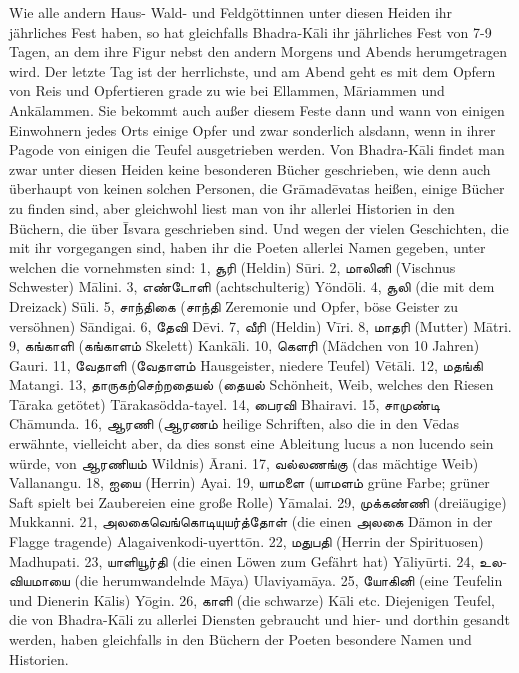 \documentclass{article}
\newcommand{\TamilText}[1]{\texttamil{#1}}
\newcommand{\tam}[1]{\TamilText{#1}}
\begin{document}
Wie alle andern Haus- Wald- und Feldgöttinnen unter diesen Heiden ihr jährliches Fest haben, so hat gleichfalls Bhadra-K\={a}li ihr jährliches Fest von 7-9 Tagen, an dem ihre Figur nebst den andern Morgens und Abends herumgetragen wird. Der letzte Tag ist der herrlichste, und am Abend geht es mit dem Opfern von Reis und Opfertieren grade zu wie bei Ellammen, M\={a}riammen und Ank\={a}lammen. Sie bekommt auch außer diesem Feste dann und wann von einigen Einwohnern jedes Orts einige Opfer und zwar sonderlich alsdann, wenn in ihrer Pagode von einigen die Teufel ausgetrieben werden. Von Bhadra-K\={a}li findet man zwar unter diesen Heiden keine besonderen Bücher geschrieben, wie denn auch überhaupt von keinen solchen Personen, die Gr\={a}mad\={e}vatas heißen, einige Bücher zu finden sind, aber gleichwohl liest man von ihr allerlei Historien in den Büchern, die über \={I}svara geschrieben sind. Und wegen der vielen Geschichten, die mit ihr vorgegangen sind, haben ihr die Poeten allerlei Namen gegeben, unter welchen die vornehmsten sind: 1, \tam{சூரி} (Heldin) S\={u}ri. 2, \tam{மாலினி} (Vischnus Schwester) M\={a}lini. 3, \tam{எண்டோளி} (achtschulterig) Yönd\={o}li. 4, \tam{சூலி} (die mit dem Dreizack) S\={u}li. 5, \tam{சாந்திகை} (\tam{சாந்தி} Zeremonie und Opfer, böse Geister zu versöhnen) S\={a}ndigai. 6, \tam{தேவி} D\={e}vi. 7, \tam{வீரி} (Heldin) V\={i}ri. 8, \tam{மாதரி} (Mutter) M\={a}tri. 9, \tam{கங்காளி} (\tam{கங்காளம்} Skelett) Kank\={a}li. 10, \tam{கெளரி} (Mädchen von 10 Jahren) Gauri. 11, \tam{வேதாளி} (\tam{வேதாளம்} Hausgeister, niedere Teufel) V\={e}t\={a}li. 12, \tam{மதங்கி} Matangi. 13, \tam{தாருகற்செற்றதையல்} (\tam{தையல்} Schönheit, Weib, welches den Riesen T\={a}raka getötet) T\={a}rakasödda-tayel. 14, \tam{பைரவி} Bhairavi. 15, \tam{சாமுண்டி} Ch\={a}munda. 16, \tam{ஆரணி} (\tam{ஆரணம்} heilige Schriften, also die in den V\={e}das erwähnte, vielleicht aber, da dies sonst eine Ableitung lucus a non lucendo sein würde, von \tam{ஆரணியம்} Wildnis) \={A}rani. 17, \tam{வல்லணங்கு} (das mächtige Weib) Vallanangu. 18, \tam{ஐயை} (Herrin) Ayai. 19, \tam{யாமளை} (\tam{யாமளம்} grüne Farbe; grüner Saft spielt bei Zaubereien eine große Rolle) Y\={a}malai. 29, \tam{முக்கண்ணி} (dreiäugige) Mukkanni. 21, \tam{அலகைவெங்கொடியுயர்த்தோள்} (die einen \tam{அலகை} Dämon in der Flagge tragende) Alagaivenkodi-uyertt\={o}n. 22, \tam{மதுபதி} (Herrin der Spirituosen) Madhupati. 23, \tam{யாளியூர்தி} (die einen Löwen zum Gefährt hat) Y\={a}liy\={u}rti. 24, \tam{உலவியமாயை} (die herumwandelnde M\={a}ya) Ulaviyam\={a}ya. 25, \tam{யோகினி} (eine Teufelin und Dienerin K\={a}lis) Y\={o}gin. 26, \tam{காளி} (die schwarze) K\={a}li etc. Diejenigen Teufel, die von Bhadra-K\={a}li zu allerlei Diensten gebraucht und hier- und dorthin gesandt werden, haben gleichfalls in den Büchern der Poeten besondere Namen und Historien.
\end{document}
